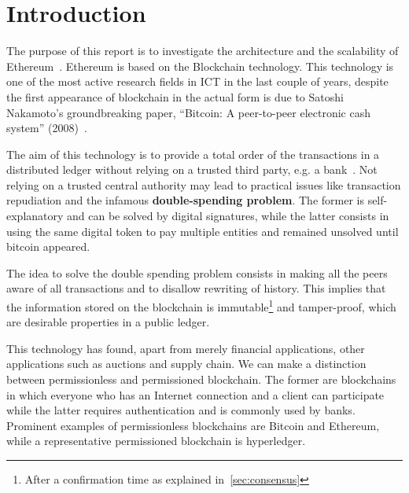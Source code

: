 \section*{Introduction}

The purpose of this report is to investigate the architecture and the 
scalability of Ethereum~\cite{wood2018ethereum}. Ethereum is based on the 
Blockchain technology. This technology is one of the most active research
fields in ICT in the last couple of years, despite the first appearance of
blockchain in the actual form is due to Satoshi Nakamoto's groundbreaking 
paper, ``Bitcoin: A peer-to-peer electronic cash system''
(2008)~\cite{bib:bitcoin}. 

The aim of this technology is to provide a total order of the 
transactions in a distributed ledger without relying on a trusted third party, 
e.g. a bank~\cite{bib:the-quest}. Not relying on a trusted central authority
may lead to practical issues like transaction repudiation and the infamous 
\textbf{double-spending problem}. The former is self-explanatory and can
be solved by digital signatures, while the latter consists in using the same
digital token to pay multiple entities and remained unsolved until bitcoin 
appeared. 

The idea to solve the double spending problem consists in making all the peers
aware of all transactions and to disallow rewriting of history. This implies
that the information stored on the blockchain is immutable\footnote{After a 
confirmation time as explained in~\autoref{sec:consensus}} and tamper-proof,
which are desirable properties in a public ledger.




This technology has found, apart from merely financial applications, other
applications such as auctions and supply chain. We can make a distinction
between permissionless and permissioned blockchain. The former are blockchains
in which everyone who has an Internet connection and a client can participate
while the latter requires authentication and is commonly used by banks.
Prominent examples of permissionless blockchains are Bitcoin and Ethereum, while
a representative permissioned blockchain is hyperledger.
